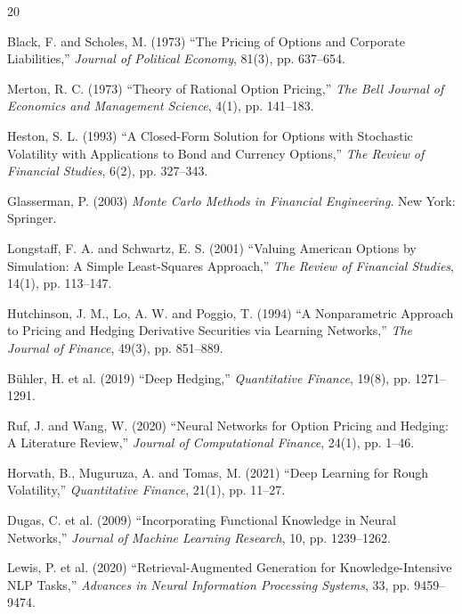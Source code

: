 \documentclass[12pt,a4paper]{report}
\begin{document}

\begin{thebibliography}{20}

Black, F. and Scholes, M. (1973) ``The Pricing of Options and Corporate Liabilities,'' \textit{Journal of Political Economy}, 81(3), pp. 637--654.

Merton, R. C. (1973) ``Theory of Rational Option Pricing,'' \textit{The Bell Journal of Economics and Management Science}, 4(1), pp. 141--183.

Heston, S. L. (1993) ``A Closed-Form Solution for Options with Stochastic Volatility with Applications to Bond and Currency Options,'' \textit{The Review of Financial Studies}, 6(2), pp. 327--343.

Glasserman, P. (2003) \textit{Monte Carlo Methods in Financial Engineering}. New York: Springer.

Longstaff, F. A. and Schwartz, E. S. (2001) ``Valuing American Options by Simulation: A Simple Least-Squares Approach,'' \textit{The Review of Financial Studies}, 14(1), pp. 113--147.

Hutchinson, J. M., Lo, A. W. and Poggio, T. (1994) ``A Nonparametric Approach to Pricing and Hedging Derivative Securities via Learning Networks,'' \textit{The Journal of Finance}, 49(3), pp. 851--889.

B\"{u}hler, H. et al. (2019) ``Deep Hedging,'' \textit{Quantitative Finance}, 19(8), pp. 1271--1291.

Ruf, J. and Wang, W. (2020) ``Neural Networks for Option Pricing and Hedging: A Literature Review,'' \textit{Journal of Computational Finance}, 24(1), pp. 1--46.

Horvath, B., Muguruza, A. and Tomas, M. (2021) ``Deep Learning for Rough Volatility,'' \textit{Quantitative Finance}, 21(1), pp. 11--27.

Dugas, C. et al. (2009) ``Incorporating Functional Knowledge in Neural Networks,'' \textit{Journal of Machine Learning Research}, 10, pp. 1239--1262.

Lewis, P. et al. (2020) ``Retrieval-Augmented Generation for Knowledge-Intensive NLP Tasks,'' \textit{Advances in Neural Information Processing Systems}, 33, pp. 9459--9474.


\end{thebibliography}
\end{document}
